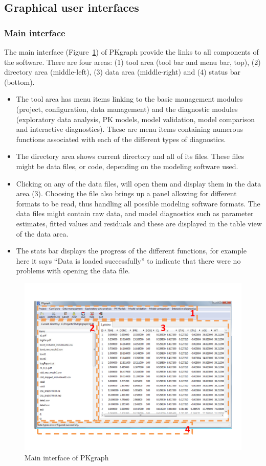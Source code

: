 \documentclass[a4paper]{article}
\begin{document}
\subsection{Graphical user interfaces}
\subsubsection{Main interface}
The main interface (Figure~\ref{c4_s2_1}) of PKgraph provide the links to all components of the software. There are four areas: (1) tool area (tool bar and menu bar, top), (2) directory area (middle-left), (3) data area (middle-right) and (4) status bar (bottom).
\newline
\newline
\begin{itemize}
	\item The tool area has menu items linking to the basic management modules (project, configuration, data management) and the diagnostic modules (exploratory data analysis, PK models, model validation, model comparison and interactive diagnostics). These are menu items containing numerous functions associated with each of the different types of diagnostics.
	\item The directory area shows current directory and all of its files. These files might be data files, or code, depending on the modeling software used.
	\item Clicking on any of the data files, will open them and display them in the data area (3).  Choosing the file also brings up a panel allowing for different formats to be read, thus handling all possible modeling software formats. The data files might contain raw data, and model diagnostics such as parameter estimates, fitted values and residuals and these are displayed in the table view of the data area.
	\item The stats bar displays the progress of the different functions, for example here it says ``Data is loaded successfully'' to indicate that there were no problems with opening the data file.
\end{itemize}
\begin{figure}[h!tb]
\centering
\includegraphics[scale=0.6]{c4_s2_1main.pdf}
\caption{Main interface of PKgraph}
\label{c4_s2_1}
\end{figure}
\end{document}
